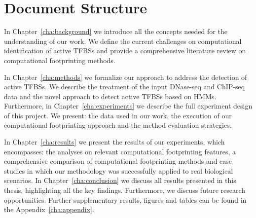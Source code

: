 \section{Document Structure}
\label{sec:document.structure}

In Chapter~\ref{cha:background} we introduce all the concepts needed for the understanding of our work. We define the current challenges on computational identification of active TFBSs and provide a comprehensive literature review on computational footprinting methods.

In Chapter~\ref{cha:methods} we formalize our approach to address the detection of active TFBSs. We describe the treatment of the input DNase-seq and ChIP-seq data and the novel approach to detect active TFBSs based on HMMs. Furthermore, in Chapter~\ref{cha:experiments} we describe the full experiment design of this project. We present: the data used in our work, the execution of our computational footprinting approach and the method evaluation strategies.

In Chapter~\ref{cha:results} we present the results of our experiments, which encompasses: the analyses on relevant computational footprinting features, a comprehensive comparison of computational footprinting methods and case studies in which our methodology was successfully applied to real biological scenarios. In Chapter~\ref{cha:conclusion} we discuss all results presented in this thesis, highlighting all the key findings. Furthermore, we discuss future research opportunities. Further supplementary results, figures and tables can be found in the Appendix~\ref{cha:appendix}.



